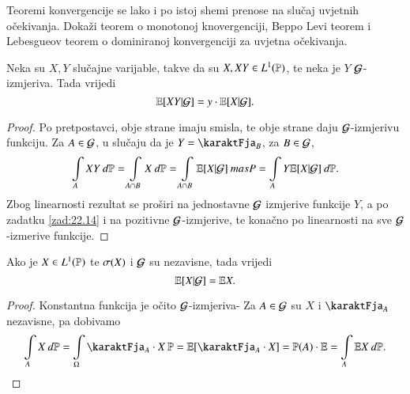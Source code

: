 \begin{zad} \label{zad:22.14}
    Teoremi konvergencije se lako i po istoj shemi prenose na slu\v caj uvjetnih o\v cekivanja.
    Doka\v zi teorem o monotonoj knovergenciji, Beppo Levi teorem i Lebesgueov teorem o dominiranoj konvergenciji za uvjetna o\v cekivanja.
\end{zad}

\begin{prop}    \label{prop:22.15}
    Neka su $X, Y$ slu\v cajne varijable, takve da su $X, X Y \in L^1 (\mathbb{P})$, te neka je $Y$ $\mathcal{G}$-izmjeriva.
    Tada vrijedi
    \begin{equation*}
        \mathbb{E} [X Y | \mathcal{G}] = y \cdot \mathbb{E} [X | \mathcal{G}].
    \end{equation*} 
\end{prop}

\begin{proof}
    Po pretpostavci, obje strane imaju smisla, te obje strane daju $\mathcal{G}$-izmjerivu funkciju.
    Za $A \in \mathcal{G}$, u slu\v caju da je $Y = \karaktFja_B$, za $B \in \mathcal{G}$,
    \begin{equation*}
        \int\limits_A X Y \: d \mathbb{P} = \int\limits_{A \cap B} X \: d \mathbb{P} = \int\limits_{A \cap B} \mathbb{E} [X | \mathcal{G}] \: masP = \int\limits_A Y \mathbb{E}[X | \mathcal{G}] \: d \mathbb{P}.
    \end{equation*}
    Zbog linearnosti rezultat se pro\v siri na jednostavne $\mathcal{G}$ izmjerive funkcije $Y$, a po zadatku \ref{zad:22.14} i na pozitivne $\mathcal{G}$-izmjerive, te kona\v cno po linearnosti na sve $\mathcal{G}$-izmerive funkcije. 
\end{proof}

\begin{prop}    \label{prop:22.16}
    Ako je $X \in L^1 (\mathbb{P})$ te $\sigma({X})$ i $\mathcal{G}$ su nezavisne, tada vrijedi
    \begin{equation*}
        \mathbb{E} [X | \mathcal{G}] = \mathbb{E} X.
    \end{equation*}
\end{prop}

\begin{proof}
    Konstantna funkcija je o\v cito $\mathcal{G}$-izmjeriva-
    Za $A \in \mathcal{G}$ su $X$ i $\karaktFja_A$ nezavisne, pa dobivamo
    \begin{equation*}
        \int\limits_A X \: d \masP = \int\limits_\Omega \karaktFja_A \cdot X \: \masP = \masE [\karaktFja_A \cdot X] = \masP(A) \cdot \masE = \int\limits_A \masE X \: d \masP.
    \end{equation*}
\end{proof}

